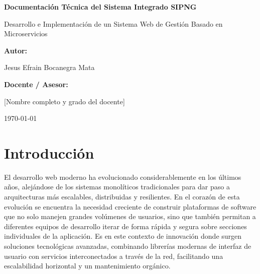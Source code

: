 \documentclass[12pt,a4paper]{report}
\begin{document}
\begin{titlepage}
    \centering
    \vspace*{2cm}
    
    {\Huge \bfseries Documentación Técnica del Sistema Integrado SIPNG\par}
    \vspace{1.5cm}
    
    {\Large Desarrollo e Implementación de un Sistema Web de Gestión Basado en Microservicios\par}
    \vspace{2cm}
    
    {\Large \bfseries Autor:\par}
    {\Large Jesus Efrain Bocanegra Mata\par}
    \vspace{1.5cm}
    
    {\Large \bfseries Docente / Asesor:\par}
    {\Large [Nombre completo y grado del docente]\par} %
    \vspace{2cm}
    
    \vfill
    {\large \today\par}
\end{titlepage}

\tableofcontents
\newpage

\chapter{Introducción}

El desarrollo web moderno ha evolucionado considerablemente en los últimos años, alejándose de los sistemas monolíticos tradicionales para dar paso a arquitecturas más escalables, distribuidas y resilientes. En el corazón de esta evolución se encuentra la necesidad creciente de construir plataformas de software que no solo manejen grandes volúmenes de usuarios, sino que también permitan a diferentes equipos de desarrollo iterar de forma rápida y segura sobre secciones individuales de la aplicación. Es en este contexto de innovación donde surgen soluciones tecnológicas avanzadas, combinando librerías modernas de interfaz de usuario con servicios interconectados a través de la red, facilitando una escalabilidad horizontal y un mantenimiento orgánico.
\end{document}
